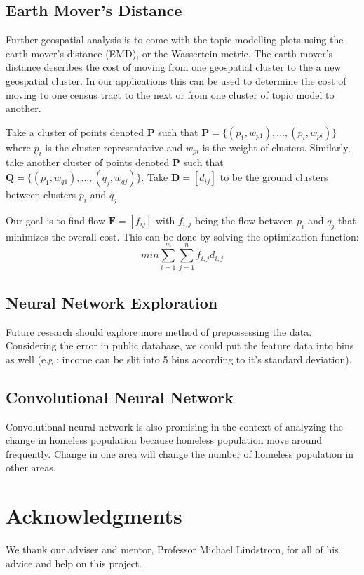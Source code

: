 \documentclass[11pt,letterpaper]{article}
\begin{document}
\subsection{Earth Mover's Distance}
Further geospatial analysis is to come with the topic modelling plots using the earth mover’s distance (EMD), or the Wassertein metric. The earth mover’s distance describes the cost of moving from one geospatial cluster to the a new geospatial cluster. In our applications this can be used to determine the cost of moving to one census tract to the next or from one cluster of topic model to another.

Take a cluster of points denoted \textbf{P} such that $\textbf{P} = \lbrace (p_{1}, w_{p1}), ..., (p_{i}, w_{pi})   \rbrace$ where $p_{i}$ is the cluster representative and $w_{pi}$ is the weight of clusters. Similarly, take another cluster of points denoted \textbf{P} such that $\textbf{Q} = \lbrace (p_{1}, w_{q1}), ..., (q_{j}, w_{qj})   \rbrace$. Take $\textbf{D} = [d_{ij}]$ to be the ground clusters between clusters $p_{i}$ and $q_{j}$

Our goal is to find flow $ \textbf{F}=[f_{ij}]$ with $f_{i,j}$ being the flow between $p_{i}$ and $q_{j}$ that minimizes the overall cost. This can be done by solving the optimization function:$$min \sum_{i=1}^{m} \sum_{j=1}^{n} f_{i,j}d_{i,j}$$

\subsection{Neural Network Exploration}
Future research should explore more method of prepossessing the data. Considering the error in public database, we could put the feature data into bins as well (e.g.: income can be slit into 5 bins according to it's standard deviation). 

\subsection{Convolutional Neural Network}
Convolutional neural network is also promising in the context of analyzing the change in homeless population because homeless population move around frequently. Change in one area will change the number of homeless population in other areas. 

\section{Acknowledgments}

We thank our adviser and mentor, Professor Michael Lindstrom, for all of his advice and help on this project.

\newpage

\printbibliography
\end{document}
